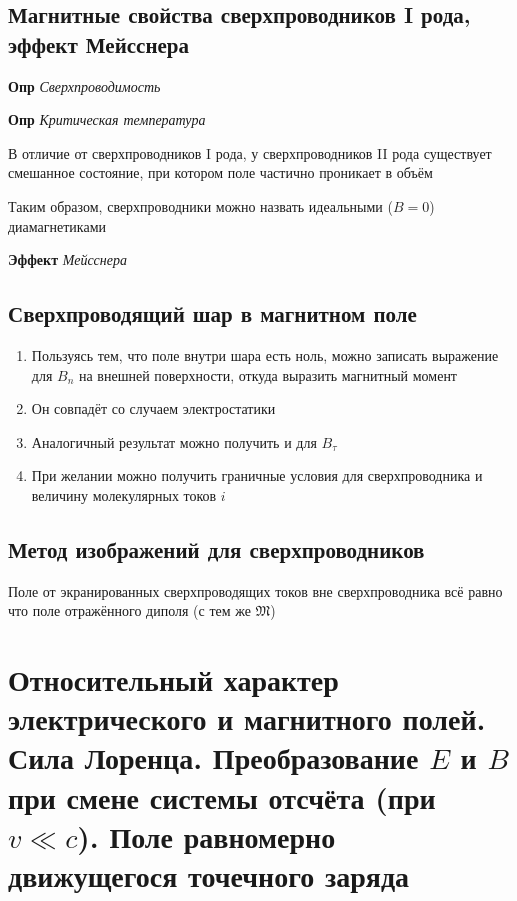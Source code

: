 \documentclass[a4paper, 14pt]{article}
\begin{document}
    \subsection{Магнитные свойства сверхпроводников I рода, эффект Мейсснера}
    
    \textbf{Опр} \textit{Сверхпроводимость}
    
    \textbf{Опр} \textit{Критическая температура}
    
    В отличие от сверхпроводников I рода, у сверхпроводников II рода существует смешанное состояние, при котором поле
    частично проникает в объём
    
    Таким образом, сверхпроводники можно назвать идеальными ($B = 0$) диамагнетиками
    
    \textbf{Эффект} \textit{Мейсснера}
    
    \subsection{Сверхпроводящий шар в магнитном поле}
    
    \begin{enumerate}
        \item Пользуясь тем, что поле внутри шара есть ноль, можно записать выражение для $B_n$ на внешней
        поверхности, откуда выразить магнитный момент
        \item Он совпадёт со случаем электростатики
        \item Аналогичный результат можно получить и для $B_\tau$
        \item При желании можно получить граничные условия для сверхпроводника и величину молекулярных токов $i$
    \end{enumerate}
    
    \subsection{Метод изображений для сверхпроводников}
    
    Поле от экранированных сверхпроводящих токов вне сверхпроводника всё равно что поле отражённого диполя (с тем же
    $\mathfrak{M}$)
    
    \section{Относительный характер электрического и магнитного полей.
    Сила Лоренца.
    Преобразование $E$ и $B$ при смене системы отсчёта (при $v \ll c$).
    Поле равномерно движущегося точечного заряда}
    
\end{document}
